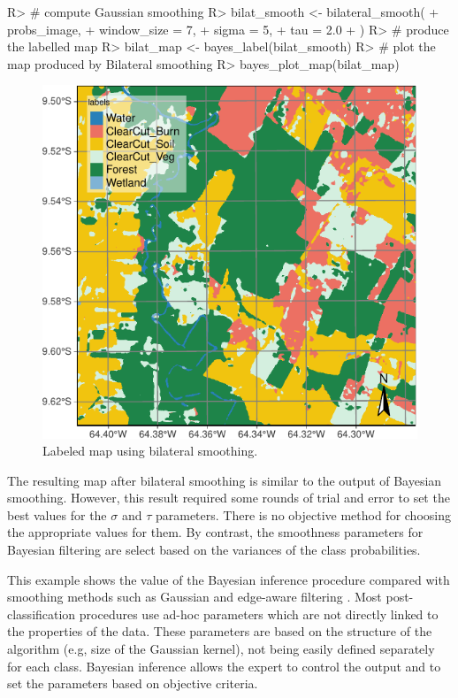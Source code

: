 \documentclass[
  shortnames]{jss}
\begin{document}
\begin{CodeChunk}
\begin{CodeInput}
R> # compute Gaussian smoothing
R> bilat_smooth <- bilateral_smooth(
+     probs_image,
+     window_size = 7,
+     sigma = 5,
+     tau = 2.0
+ )
R> # produce the labelled map
R> bilat_map <- bayes_label(bilat_smooth)
R> # plot the map produced by Bilateral smoothing
R> bayes_plot_map(bilat_map)
\end{CodeInput}
\begin{figure}[h]

{\centering \includegraphics{Bayesian_smoothing_JSS_files/figure-latex/bilat-1} 

}

\caption[Labeled map using bilateral smoothing]{Labeled map using bilateral smoothing.}\label{fig:bilat}
\end{figure}
\end{CodeChunk}

The resulting map after bilateral smoothing is similar to the output of Bayesian smoothing. However, this result required some rounds of trial and error to set the best values for the \(\sigma\) and \(\tau\) parameters. There is no objective method for choosing the appropriate values for them. By contrast, the smoothness parameters for Bayesian filtering are select based on the variances of the class probabilities.

This example shows the value of the Bayesian inference procedure compared with smoothing methods such as Gaussian and edge-aware filtering \citep{Schindler2012}. Most post-classification procedures use ad-hoc parameters which are not directly linked to the properties of the data. These parameters are based on the structure of the algorithm (e.g, size of the Gaussian kernel), not being easily defined separately for each class. Bayesian inference allows the expert to control the output and to set the parameters based on objective criteria.
\end{document}
